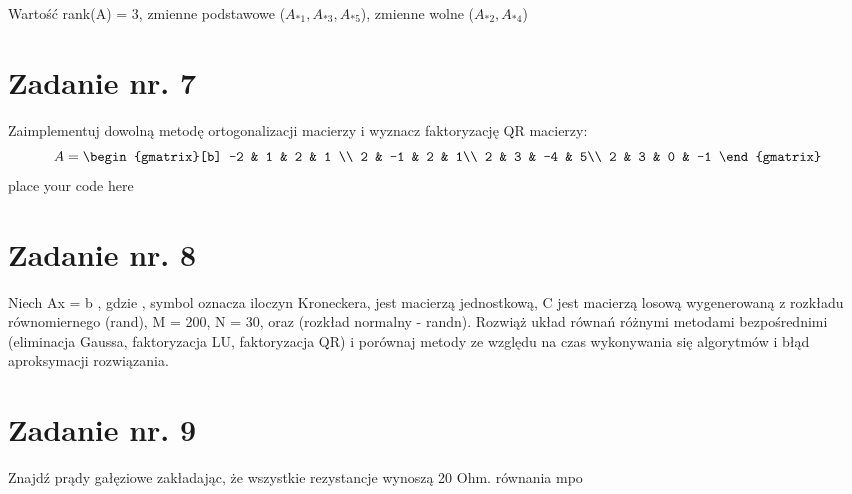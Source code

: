 \documentclass{article}
\begin{document}
Wartość rank(A) = 3, zmienne podstawowe ($A_{*1},A_{*3},A_{*5}$), zmienne wolne ($A_{*2},A_{*4}$)

\section{Zadanie nr. 7}
Zaimplementuj dowolną metodę ortogonalizacji macierzy i wyznacz faktoryzację
QR macierzy:
\begin{equation}
  A=
  \begin{gmatrix}[b]
  -2 & 1 & 2 & 1 \\
  2 & -1 & 2 & 1\\
  2 & 3 & -4 & 5\\
  2 & 3 & 0 & -1 
\end{gmatrix}
\end{equation}
place your code here

\section{Zadanie nr. 8}

Niech Ax = b , gdzie , symbol  oznacza iloczyn Kroneckera,
 jest macierzą jednostkową,  C jest macierzą losową wygenerowaną z rozkładu
równomiernego (rand), M = 200, N = 30, oraz   (rozkład normalny - randn).
Rozwiąż układ równań różnymi metodami bezpośrednimi (eliminacja Gaussa, faktoryzacja LU,
faktoryzacja QR) i porównaj metody ze względu na czas wykonywania się algorytmów i błąd
aproksymacji rozwiązania.



\section{Zadanie nr. 9}
Znajdź prądy gałęziowe zakładając, że wszystkie rezystancje wynoszą 20 Ohm.
równania
mpo
\end{document}
